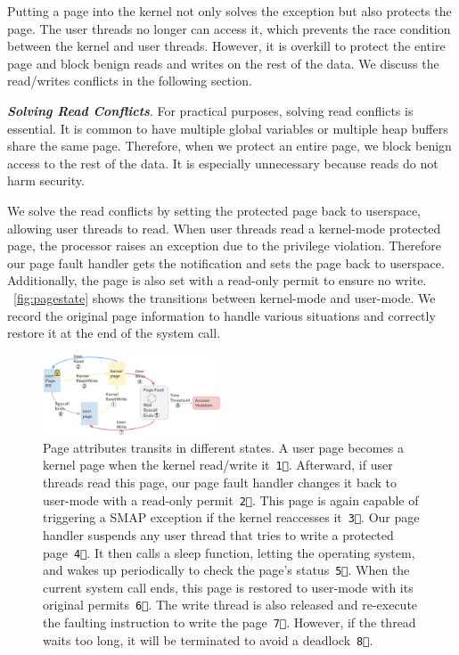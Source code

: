 Putting a page into the kernel not only solves the exception but also protects the page. The user threads no longer can access it, which prevents the race condition between the kernel and user threads. However, it is overkill to protect the entire page and block benign reads and writes on the rest of the data. We discuss the read/writes conflicts in the following section.



\textbf{\textit{Solving Read Conflicts}}. For practical purposes, solving
read conflicts is essential. It is common to have multiple global
variables or multiple heap buffers share the same page. Therefore, when we protect an entire page, we block benign access to the rest of the data. It is especially unnecessary because reads do not harm security.

We solve the read conflicts by setting the protected page
back to userspace, allowing user threads to read. When user threads read a kernel-mode protected page, the processor raises an exception due to the privilege violation. Therefore our page fault handler gets the notification and sets the page back to userspace. Additionally, the page is also set with a read-only permit to ensure no write. ~\autoref{fig:pagestate} shows the transitions between kernel-mode and user-mode.  We record the original page information to handle various situations and correctly restore it at the end of the system call.


\begin{figure}[th]
  \includegraphics[width=0.47\textwidth]{figures/pagestate4}
  \centering
  \caption{Page attributes transits in different states. A user page becomes a kernel page when the kernel read/write it~\texttt{\textcircled{1}}. Afterward, if user threads read this page, our page fault handler changes it back to user-mode with a read-only permit~\texttt{\textcircled{2}}. This page is again capable of triggering a SMAP exception if the kernel reaccesses it~\texttt{\textcircled{3}}. Our page handler suspends any user thread that tries to write a protected page~\texttt{\textcircled{4}}. It then calls a sleep function, letting the operating system, and wakes up periodically to check the page's status~\texttt{\textcircled{5}}. When the current system call ends, this page is restored to user-mode with its original permits~\texttt{\textcircled{6}}. The write thread is also released and re-execute the faulting instruction to write the page~\texttt{\textcircled{7}}. However, if the thread waits too long, it will be terminated to avoid a deadlock~\texttt{\textcircled{8}}.}
  \label{fig:pagestate}
\end{figure}



